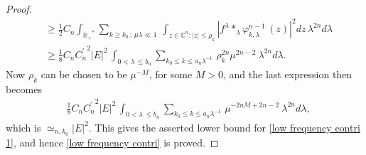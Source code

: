\documentclass[10pt,a4paper]{amsart}
\newcommand{\Ca}{\mathbb{C}^n}
\newcommand{\R}{\ensuremath{\mathbb{R_+}}}
\begin{document}
\begin{proof}
\begin{equation*}
    \begin{split}
      & \geq \frac{1}{2} C_{n} \int_{\R^{*}} \sum_{ k \geq k_{0} \, : \,  \mu \lambda \ll 1  } \,   \int_{z \in \Ca : |z | \leq \rho_{k}} |f^{\lambda} \ast_{\lambda} \varphi_{k, \lambda}^{n-1} \, (z)|^2 dz \, \lambda^{2n} d\lambda   \\
       & \geq \frac18 C_{n}{C_n^{\prime}}^2 |E|^2 \,   \int_{0 <\lambda \,  \leq  b_n} \sum_{k_{0} \leq  k \leq a_{n} \lambda^{-1}   } \,   \rho_{k}^{2n} \mu^{2n-2} \ \lambda^{2n} d\lambda.
    \end{split}
\end{equation*}
Now $\rho_{k}$ can be chosen to be $\mu^{-M}$, for some $M>0$, and the last expression then becomes
\begin{equation*}
    \begin{split}       
       &  \frac18 C_{n}{C_n^{\prime}}^2 |E|^2 \,   \int_{0 <\lambda \,  \leq  b_n} \sum_{k_{0} \leq  k \leq a_{n} \lambda^{-1}   } \,  \mu^{-2n M + 2n-2} \ \lambda^{2n} d\lambda,
\end{split}
\end{equation*}
which is $\simeq_{n, k_{0}} |E|^2$. This gives the asserted lower bound for \eqref{low frequency contri 1}, and hence \eqref{low frequency contri} is proved. 


\end{proof}
\end{document}

